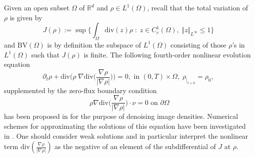 \documentclass[12pt, a4paper]{article}
\numberwithin{equation}{section}
\theoremstyle{plain}
\theoremstyle{definition}
\theoremstyle{remark}
\newcommand{\R}{\mathbb{R}}
\newcommand{\BV}{\mathrm{BV}}
\newcommand{\dive}{\mathrm{div}}
\begin{document}
\smallskip


Given an open subset $\Omega$ of $\R^d$ and $\rho \in L^1(\Omega)$, recall that the total variation of $\rho$ is given by
\begin{equation}\label{deftv}
J(\rho):=\sup \Big\{ \int_{\Omega} \dive(z) \rho \; : \; z\in C_c^1(\Omega), \; \Vert z \Vert_{L^\infty} \le 1  \Big\}
\end{equation}
and $\BV(\Omega)$ is by definition the subspace of $L^1(\Omega)$ consisting of those $\rho$'s in $L^1(\Omega)$ such that $J(\rho)$ is finite. The following fourth-order nonlinear evolution equation 
\begin{equation}\label{pde4}
\partial_t \rho+ \dive \Big(\rho \;  \nabla  \dive  \Big( \frac{\nabla \rho}{\vert \nabla \rho \vert} \Big)  \Big)=0, \mbox{ in $(0,T)\times\Omega$}, \; \rho_{\vert_{t=0}}=\rho_0,  
\end{equation}
supplemented by the zero-flux boundary condition
\begin{equation}\label{zerofluxbc}
\; \rho \nabla  \dive   \Big(  \frac{\nabla \rho}{\vert \nabla \rho \vert}   \Big) \cdot \nu=0 \mbox{ on $\partial \Omega$}
\end{equation}
 has been proposed in  \cite{burger2012regularized} for the purpose of denoising image densities. Numerical schemes for approximating the solutions of this equation have been investigated in \cite{burger2012regularized,during2012high,benning2013primal}. One should consider weak solutions and in particular interpret the nonlinear term $\dive(\frac{\nabla \rho}{\vert \nabla \rho\vert})$ as the negative of an element of the subdifferential of $J$ at $\rho$. 
 
 
 
\end{document}
